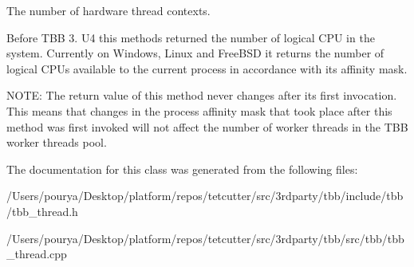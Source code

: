 The number of hardware thread contexts. 

Before T\+B\+B 3. U4 this methods returned the number of logical C\+P\+U in the system. Currently on Windows, Linux and Free\+B\+S\+D it returns the number of logical C\+P\+Us available to the current process in accordance with its affinity mask.

N\+O\+T\+E\+: The return value of this method never changes after its first invocation. This means that changes in the process affinity mask that took place after this method was first invoked will not affect the number of worker threads in the T\+B\+B worker threads pool. 

The documentation for this class was generated from the following files\+:\begin{DoxyCompactItemize}
\item 
/\+Users/pourya/\+Desktop/platform/repos/tetcutter/src/3rdparty/tbb/include/tbb/tbb\+\_\+thread.\+h\item 
/\+Users/pourya/\+Desktop/platform/repos/tetcutter/src/3rdparty/tbb/src/tbb/tbb\+\_\+thread.\+cpp\end{DoxyCompactItemize}
